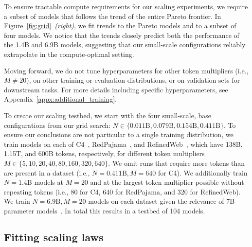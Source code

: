 \documentclass[dvipsnames,11pt]{article}
\begin{document}
To ensure tractable compute requirements for our scaling experiments, we require a subset of models that follows the trend of the entire Pareto frontier.
In Figure~\ref{fig:grid}~\emph{(right)}, we fit trends to the Pareto models and to a subset of four models.
We notice that the trends closely predict both the performance of the 1.4B and 6.9B models, suggesting that our small-scale configurations reliably extrapolate in the compute-optimal setting.

Moving forward, we do not tune hyperparameters for other token multipliers (i.e., $M \neq 20$), on other training or evaluation distributions, or on validation sets for downstream tasks.
For more details including specific hyperparameters, see Appendix~\ref{appx:additional_training}.

To create our scaling testbed, we start with the four small-scale, base configurations from our grid search: $N\in \{0.011\text{B}, 0.079\text{B}, 0.154\text{B}, 0.411\text{B}\}$.
To ensure our conclusions are not particular to a single training distribution, we train models on each of C4~\cite{c4,c4_ai2}, RedPajama~\cite{rpj}, and RefinedWeb~\cite{refinedweb}, which have 138B, 1.15T, and 600B tokens, respectively, for different token multipliers $M \in \{5, 10, 20, 40, 80, 160, 320, 640\}$.
We omit runs that require more tokens than are present in a dataset (i.e., $N=0.411\text{B}, M=640$ for C4).
We additionally train $N=1.4$B models at $M=20$ and at the largest token multiplier possible without repeating tokens (i.e., 80 for C4, 640 for RedPajama, and 320 for RefinedWeb).
We train $N=6.9\text{B}, M=20$ models on each dataset given the relevance of 7B parameter models~\citep{llama,jiang2023mistral}.
In total this results in a testbed of 104 models.

\subsection{Fitting scaling laws}
\label{sec:fitting}
\end{document}
